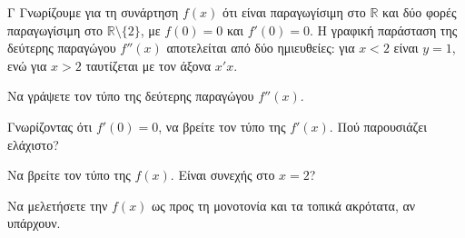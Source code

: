 \begin{thema}{Γ}
Γνωρίζουμε για τη συνάρτηση $f(x)$ ότι είναι παραγωγίσιμη στο $\mathbb{R}$ και δύο φορές παραγωγίσιμη στο $\mathbb{R}\setminus\{2\}$, με $f(0) = 0$ και $f'(0) = 0$. Η γραφική παράσταση της δεύτερης παραγώγου $f''(x)$ αποτελείται από δύο ημιευθείες: για $x<2$ είναι $y = 1$, ενώ για $x>2$ ταυτίζεται με τον άξονα $x'x$.
\begin{erwthma}
  \item Να γράψετε τον τύπο της δεύτερης παραγώγου $f''(x)$.
  \item Γνωρίζοντας ότι $f'(0) = 0$, να βρείτε τον τύπο της $f'(x)$. Πού παρουσιάζει ελάχιστο?
  \item Να βρείτε τον τύπο της $f(x)$. Είναι συνεχής στο $x=2$?
  \item Να μελετήσετε την $f(x)$ ως προς τη μονοτονία και τα τοπικά ακρότατα, αν υπάρχουν.
\end{erwthma}
\end{thema}
